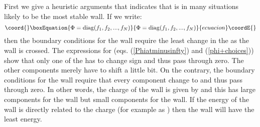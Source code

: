 \documentclass[a4paper,prd,nofootinbib,twocolumn,showpacs]{revtex4}
\begin{document}
First we give a heuristic arguments that indicates that 
\coordHE{} is in many situations likely to be the most stable 
wall. If we write:
\begin{equation}\coord{}\boxEquation{
\Phi = {\rm diag} (f_1, f_2,...,f_N)
\label{Phiinfrep}
}{
\Phi = {\rm diag} (f_1, f_2,...,f_N)
}{ecuacion}\coordE{}\end{equation}
then the boundary conditions for the \coordHE{} wall require the 
least change in the \coordHE{} as the wall is crossed. The 
expressions for \myHighlight{$\Phi_\pm$}\coordHE{} (eqs. (\ref{Phiatminusinfty}) 
and (\ref{phi+choices})) show that only one of the \coordHE{} 
has to change sign and thus pass through zero. The other 
components merely have to shift a little bit. On the contrary,
the boundary conditions for the \coordHE{} wall require that every 
component \coordHE{} change to \coordHE{} and thus pass through zero. 
In other words, the charge of the wall is given by 
\coordHE{} and this has large components for 
the \coordHE{} wall but small components for the \coordHE{} wall. 
If the energy of the wall is directly related to the charge 
(for example as \coordHE{}) then the \coordHE{} wall will have 
the least energy.
\end{document}
